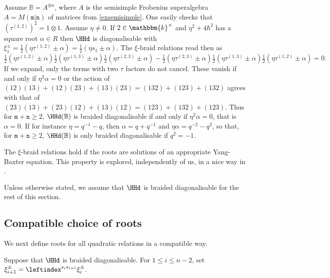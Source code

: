 \documentclass[a4paper,11pt]{amsart}
\numberwithin{equation}{subsection}
\theoremstyle{definition}
\theoremstyle{theorem}
\theoremstyle{remark}
\newcommand\taui[1][i]{\tau^{(#1)}}
\newcommand\kk{\mathbbm{k}}
\newcommand{\Bo}{\mathbb{B}}
\begin{document}
\begin{Example}\label{semisimple}
Assume $\Bo=A^{\otimes n}$, where $A$ is the semisimple Frobenius
superalgebra $A=M(\mathtt{m}|\mathtt{n})$ of matrices from \autoref{exsemisimple}. One
easily checks that $(\taui[1,2])^2=1\otimes1$.
Assume $\eta\not=0$. If $2\in\kk^{\times}$ and $\eta^{2}+4\hbar^{2}$ has a square root $\alpha\in R$ then $\HHd$ is diagonalisable with
$\xi^\pm_1=\tfrac12\left(\eta\taui[1,2]\pm\alpha\right)=\tfrac12\left(\eta s_1\pm\alpha\right)$. The $\xi$-braid relations read then as
\[\tfrac12\left(\eta\taui[1,2]\pm\alpha\right)\tfrac12\left(\eta\taui[1,3]\pm\alpha\right)\tfrac12\left(\eta\taui[2,3]\pm\alpha\right)
-\tfrac12\left(\eta\taui[2,3]\pm\alpha\right)\tfrac12\left(\eta\taui[1,3]\pm\alpha\right)\tfrac12\left(\eta\taui[1,2]\pm\alpha\right)=0.\]
If we expand, only the terms with two $\tau$ factors do not cancel. These vanish if and only if $\eta^2\alpha=0$ or the action of $(12)(13)+(12)(23)+(13)(23)=(132)+(123)+(132)$ agrees with that of   $(23)(13)+(23)(12)+(13)(12)=(123)+(132)+(123)$. Thus for $\mathtt{m}+\mathtt{n}\geq 2$, $\HHd(\Bo)$ is braided diagonalisable if and only if $\eta^2\alpha=0$, that is $\alpha=0$. If for instance $\eta=q^{-1}-q$, then  $\alpha=q+q^{-1}$ and $\eta\alpha=q^{-2}-q^{2}$, so that,  for $\mathtt{m}+\mathtt{n}\geq 2$,  $\HHd(\Bo)$ is only braided diagonalisable if $q^2=-1$.
\end{Example}
\begin{Remark}The $\xi$-braid relations hold if the roots are solutions of an appropriate Yang-Baxter equation. This property is explored, independently of us,  in a nice way in \cite{MinetsYBE}.
\end{Remark}

 Unless otherwise stated, we assume that $\HHd$ is
 braided diagonalisable for the rest of this section.

 \subsection{Compatible choice of roots}
We next define roots for all quadratic relations in a compatible way.

 \begin{Definition}\label{D:xis}
    Suppose that $\HHd$ is braided diagonalisable. For $1\le i\le n-2$, set
    ${\xi_{i+1}^\pm} =\leftindex^{s_is_{i+1}}{{\xi_{i}^\pm}}$.
 \end{Definition}
\end{document}
